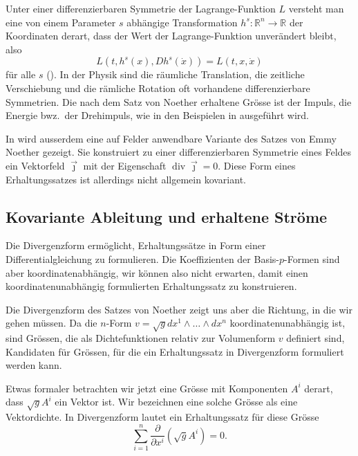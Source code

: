 Unter einer differenzierbaren Symmetrie der Lagrange-Funktion $L$
versteht man eine von einem
Parameter $s$ abhängige Transformation $h^s\colon \mathbb{R}^n\to \mathbb{R}$
der Koordinaten derart, dass der Wert der Lagrange-Funktion unverändert
bleibt, also
\[
L(t,h^s(x),Dh^s(\dot{x}))
=
L(t,x,\dot{x})
\]
für alle $s$ (\cite[Definition 10.4]{buch:seminarvariation}).
In der Physik sind die räumliche Translation, die zeitliche Verschiebung
und die rämliche Rotation oft vorhandene differenzierbare Symmetrien.
Die nach dem Satz von Noether erhaltene Grösse ist
der Impuls, die Energie bwz.~der Drehimpuls, wie in den Beispielen
in \cite[Abschnitt 10.2]{buch:seminarvariation} ausgeführt wird.

In \cite[Abschnitt 10.3]{buch:seminarvariation} wird ausserdem eine auf
Felder anwendbare Variante des Satzes von Emmy Noether gezeigt.
Sie konstruiert zu einer differenzierbaren Symmetrie eines Feldes
ein Vektorfeld $\vec{\jmath}$ mit der Eigenschaft
$\operatorname{div}\vec{\jmath}=0$.
Diese Form eines Erhaltungssatzes ist allerdings nicht allgemein
kovariant.

%
%
\subsection{Kovariante Ableitung und erhaltene Ströme
\label{buch:zusammenhang:divergenz:subsetion:kovariant}}
Die Divergenzform ermöglicht, Erhaltungssätze in Form einer 
Differentialgleichung zu formulieren.
Die Koeffizienten der Basis-$p$-Formen sind aber koordinatenabhängig,
wir können also nicht erwarten, damit einen koordinatenunabhängig
formulierten Erhaltungssatz zu konstruieren.

Die Divergenzform des Satzes von Noether zeigt uns aber die Richtung,
in die wir gehen müssen.
Da die $n$-Form $v=\sqrt{g} dx^1\wedge \dots\wedge dx^n$
koordinatenunabhängig ist, sind Grössen, die als Dichtefunktionen
relativ zur Volumenform $v$ definiert sind, Kandidaten für Grössen,
für die ein Erhaltungssatz in Divergenzform formuliert werden kann.

Etwas formaler betrachten wir jetzt eine Grösse mit Komponenten $A^i$
derart, dass $\sqrt{g}A^i$ ein Vektor ist.
Wir bezeichnen eine solche Grösse als eine Vektordichte.
In Divergenzform lautet ein Erhaltungssatz für diese Grösse
\[
\sum_{i=1}^n \frac{\partial}{\partial x^i} (\!\sqrt{g}A^i)
=
0.
\]

